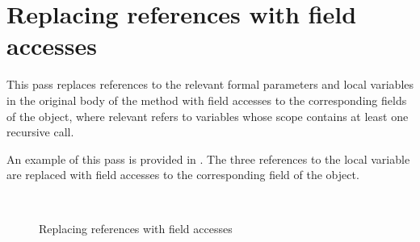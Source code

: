 \section{Replacing references with field accesses}

This pass replaces references to the relevant formal parameters and local variables in the original body of the method
with field accesses to the corresponding fields of the  object, where relevant refers to variables whose
scope contains at least one recursive call.

An example of this pass is provided in . The three references to the local
variable  are replaced with field accesses to the corresponding field of the  object.

\begin{figure}[htb]
    \\
    \caption{Replacing references with field accesses \label{img:replace-identifier}}
\end{figure}